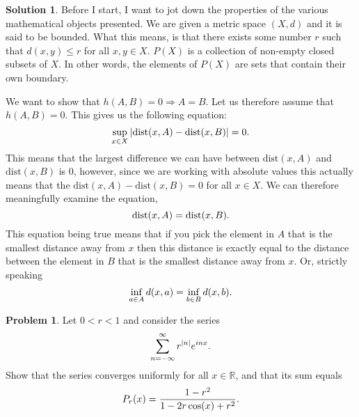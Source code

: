 \documentclass[a4paper]{article}
\theoremstyle{definition}
\newtheorem{prb}{Problem}
\newtheorem{sltn}{Solution}
\newcommand{\dist}{\text{dist}}
\newcommand{\rimply}{\Longrightarrow}
\begin{document}
\begin{sltn}
  Before I start, I want to jot down the properties of the various mathematical
  objects presented.  We are given a metric space $\left( X, d \right)$ and it
  is said to be bounded. What this means, is that there exists some number $r$
  such that $d(x, y) \leq r$ for all $x, y \in X$.  $P\left( X \right)$ is a
  collection of non-empty closed subsets of $X$.  In other words, the elements
  of $P\left( X \right)$ are sets that contain their own boundary.

  We want to show that $h\left( A, B \right) = 0 \rimply A = B$. Let us therefore assume that
  $h\left( A, B \right) = 0$. This gives us the following equation:
  \begin{equation}
    \notag
    \sup_{x\in X}\left|\dist(x, A) - \dist(x, B)\right| = 0. 
  \end{equation}
  This means that the largest difference we can have between $\dist(x, A)$ and
  $\dist(x, B)$ is $0$, however, since we are working with absolute values this
  actually means that the $\dist(x, A) - \dist(x, B) = 0$ for all $x \in X$.
  We can therefore meaningfully examine the equation, 
  \begin{equation}
    \notag
    \dist(x, A) = \dist(x, B).
  \end{equation}
  This equation being true means that if you pick the element in $A$ that is the smallest
  distance away from $x$ then this distance is exactly equal to the distance
  between the element in $B$ that is the smallest distance away from $x$. Or, strictly
  speaking
  \begin{equation}
    \notag
    \inf_{a \in A} d(x, a) = \inf_{b \in B} d(x, b). 
  \end{equation}


\end{sltn}

\begin{prb}
  Let $0 < r < 1$ and consider the series
  \begin{equation}
    \notag
    \sum_{n=-\infty}^{\infty}r^{|n|}e^{inx}.
  \end{equation}
  Show that the series converges uniformly for all $x \in \mathbb{R}$, and that
  its sum equals
  \begin{equation}
    \notag
    P_{r}(x) = \frac{1-r^{2}}{1 - 2r \cos(x)+r^{2}}.
  \end{equation}
\end{prb}
\end{document}

